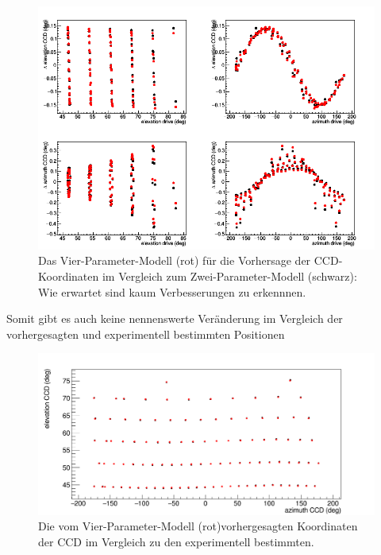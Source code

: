 \begin{figure}[htbp]
\centering
\includegraphics[width=\textwidth]{../341/D2C44comp.png}
\caption{Das Vier-Parameter-Modell (rot) für die Vorhersage der CCD-Koordinaten im Vergleich zum Zwei-Parameter-Modell (schwarz): Wie erwartet sind kaum Verbesserungen zu erkennnen.}
\label{img:D2C4comp}
\end{figure}
Somit gibt es auch keine nennenswerte Veränderung im Vergleich der vorhergesagten und experimentell bestimmten Positionen
\begin{figure}[htbp]
\centering
\includegraphics[width=\textwidth]{../341/D2C4comp2.png}
\caption{Die vom Vier-Parameter-Modell (rot)vorhergesagten Koordinaten der CCD im Vergleich zu den experimentell bestimmten.}
\label{img:D2C4comp2}
\end{figure}

